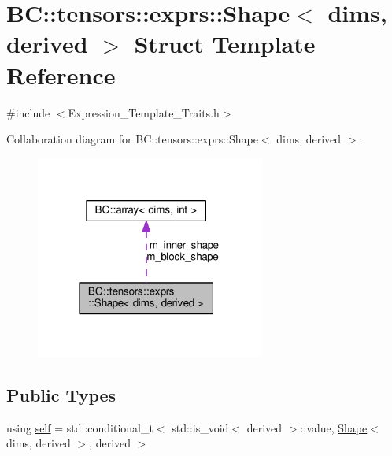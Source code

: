\hypertarget{classBC_1_1tensors_1_1exprs_1_1Shape}{}\section{BC\+:\+:tensors\+:\+:exprs\+:\+:Shape$<$ dims, derived $>$ Struct Template Reference}
\label{classBC_1_1tensors_1_1exprs_1_1Shape}


{\ttfamily \#include $<$Expression\+\_\+\+Template\+\_\+\+Traits.\+h$>$}



Collaboration diagram for BC\+:\+:tensors\+:\+:exprs\+:\+:Shape$<$ dims, derived $>$\+:
\nopagebreak
\begin{figure}[H]
\begin{center}
\leavevmode
\includegraphics[width=214pt]{classBC_1_1tensors_1_1exprs_1_1Shape__coll__graph}
\end{center}
\end{figure}
\subsection*{Public Types}
\begin{DoxyCompactItemize}
\item 
using \hyperlink{classBC_1_1tensors_1_1exprs_1_1Shape_ab3bf59646b50856337de082c3ef54ebd}{self} = std\+::conditional\+\_\+t$<$ std\+::is\+\_\+void$<$ derived $>$\+::value, \hyperlink{classBC_1_1tensors_1_1exprs_1_1Shape}{Shape}$<$ dims, derived $>$, derived $>$
\end{DoxyCompactItemize}
